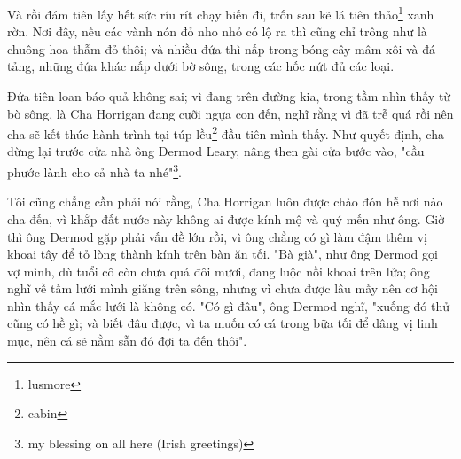 Và rồi đám tiên lấy hết sức ríu rít chạy biến đi, trốn sau kẽ lá tiên thảo\footnote{lusmore} xanh rờn. Nơi đây, nếu các vành nón đỏ nho nhỏ có lộ ra thì cũng chỉ trông như là chuông hoa thẫm đỏ thôi; và nhiều đứa thì nấp trong bóng cây mâm xôi và đá tảng, những đứa khác nấp dưới bờ sông, trong các hốc nứt đủ các loại.

Đứa tiên loan báo quả không sai; vì đang trên đường kia, trong tầm nhìn thấy từ bờ sông, là Cha Horrigan đang cưỡi ngựa con đến, nghĩ rằng vì đã trễ quá rồi nên cha sẽ kết thúc hành trình tại túp lều\footnote{cabin} đầu tiên mình thấy. Như quyết định, cha dừng lại trước cửa nhà ông Dermod Leary, nâng then gài cửa bước vào, "cầu phước lành cho cả nhà ta nhé"\footnote{my blessing on all here (Irish greetings)}.

Tôi cũng chẳng cần phải nói rằng, Cha Horrigan luôn được chào đón hễ nơi nào cha đến, vì khắp đất nước này không ai được kính mộ và quý mến như ông. Giờ thì ông Dermod gặp phải vấn đề lớn rồi, vì ông chẳng có gì làm đậm thêm vị khoai tây để tỏ lòng thành kính trên bàn ăn tối. "Bà già", như ông Dermod gọi vợ mình, dù tuổi cô còn chưa quá đôi mươi, đang luộc nồi khoai trên lửa; ông nghĩ về tấm lưới mình giăng trên sông, nhưng vì chưa được lâu mấy nên cơ hội nhìn thấy cá mắc lưới là không có. "Có gì đâu", ông Dermod nghĩ, "xuống đó thử cũng có hề gì; và biết đâu được, vì ta muốn có cá trong bữa tối để dâng vị linh mục, nên cá sẽ nằm sẵn đó đợi ta đến thôi".
